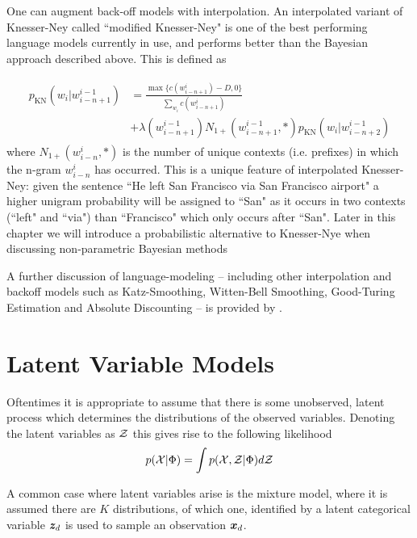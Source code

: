 One can augment back-off models with interpolation. An interpolated variant of Knesser-Ney called ``modified Knesser-Ney"\cite{Chen1999} is one of the best performing language models currently in use, and performs better than the Bayesian approach described above\cite{Teh2002}. This is defined as

\begin{align}
\begin{split}
p_\text{KN}(w_i | w^{i-1}_{i-n+1}) & = 
\frac{\max\{c(w^i_{i-n+1}) - D, 0\}}{\sum_{w_i} c(w^i_{i-n+1})} \\
& + \lambda(w^{i-1}_{i-n+1}) N_{1+}(w^{i-1}_{i-n+1}, *) p_\text{KN}(w_i | w^{i-1}_{i-n+2})
\end{split}
\end{align}
where $N_{1+}(w^{i}_{i-n}, *)$ is the number of unique contexts (i.e. prefixes) in which the n-gram $w^{i}_{i-n}$ has occurred.  This is a unique feature of interpolated Knesser-Ney: given the sentence ``He left San Francisco via San Francisco airport" a higher unigram probability will be assigned to ``San" as it occurs in two contexts (``left" and ``via") than ``Francisco" which only occurs after ``San". Later in this chapter we will introduce a probabilistic alternative to Knesser-Nye when discussing non-parametric Bayesian methods

A further discussion of language-modeling -- including other interpolation and backoff models such as Katz-Smoothing, Witten-Bell Smoothing, Good-Turing Estimation and Absolute Discounting -- is provided by \cite{Goodman2001}.


 
\section{Latent Variable Models}
Oftentimes it is appropriate to assume that there is some unobserved, latent process which determines the distributions of the observed variables. Denoting the latent variables as ${ \mathcal{Z} }$ this gives rise to the following likelihood
\begin{align}
p({ \mathcal{X} }|{ \Phi }) = \int p({ \mathcal{X} }, { \mathcal{Z} }|{ \Phi }) d{ \mathcal{Z} }
\end{align}

A common case where latent variables arise is the mixture model, where it is assumed there are $K$ distributions, of which one, identified by a latent categorical variable $\bm z_d$ is used to sample an observation ${ \bm x_d }$. 

